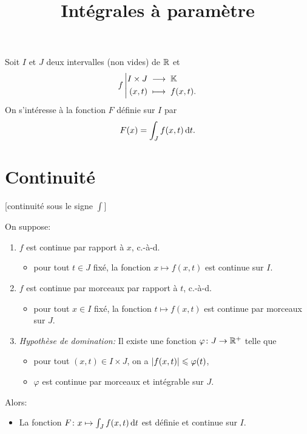 \documentclass{yann}
\begin{document}
\title{Intégrales à paramètre}
\maketitle


Soit $I$ et $J$ deux intervalles (non vides) de $\mathbb{R}$ et
\[ {f}\left|\begin{aligned}{I\times J}&\;\longrightarrow\;{\mathbb{K}}\\{(x,t)}&\;\longmapsto\;{f(x,t).}\end{aligned}\right. \]
On s'intéresse à la fonction $F$ définie sur $I$ par
\[ F(x) = \int_J f(x,t) \mathop{}\!\mathrm{d} t. \]

\section{Continuité}

[continuité sous le signe $\int$]

On suppose:
\begin{enumerate}
\item
$f$ est continue par rapport à $x$, c.-à-d.

  \begin{itemize}
  \item
pour tout $t\in J$ fixé, la fonction $x \mapsto f(x,t)$ est continue sur $I$.
  \end{itemize}
\item
$f$ est continue par morceaux par rapport à $t$, c.-à-d.

  \begin{itemize}
  \item
pour tout $x\in I$ fixé, la fonction $t \mapsto f(x,t)$ est continue par morceaux sur $J$.
  \end{itemize}
\item
\emph{Hypothèse de domination:}
  Il existe une fonction $\varphi\colon J\to\mathbb{R}^+$ telle que

  \begin{itemize}
  \item
pour tout $(x,t)\in I\times J$, on a $\left|{f(x,t)}\right|\leqslant\varphi(t)$,
  \item
$\varphi$ est continue par morceaux et intégrable sur $J$.
  \end{itemize}
\end{enumerate}

Alors:
\begin{itemize}
\item
La fonction $F \colon x \mapsto \int_J f(x,t) \mathop{}\!\mathrm{d} t$ est définie et continue sur $I$.
\end{itemize}
\end{document}
